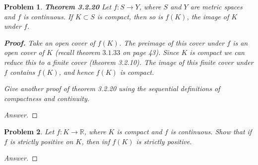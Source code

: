 \documentclass{article}
\newtheorem{problem}{Problem}
\begin{document}
\begin{problem}
   \textbf{Theorem 3.2.20}
    Let $f: S \rightarrow Y$, where $S$ and $Y$ are metric spaces and $f$ is continuous. If $K \subset S$ is compact, then so is $f(K)$, the image of $K$ under $f$.
    
    \textbf{Proof.} Take an open cover of $f(K)$. The preimage of this cover under $f$ is an open cover of $K$ (recall theorem $3.1 .33$ on page 43). Since $K$ is compact we can reduce this to a finite cover (theorem 3.2.10). The image of this finite cover under $f$ contains $f(K)$, and hence $f(K)$ is compact.

    Give another proof of theorem 3.2.20 using the sequential definitions
of compactness and continuity.

\end{problem}
\begin{proof}[Answer]
    
\end{proof}


\begin{problem}Let $f: K \rightarrow \mathbb{R}$, where $K$ is compact and $f$ is continuous. Show that if $f$ is strictly positive on $K$, then inf $f(K)$ is strictly positive.

\end{problem}
\begin{proof}[Answer]
    
\end{proof}
\end{document}
